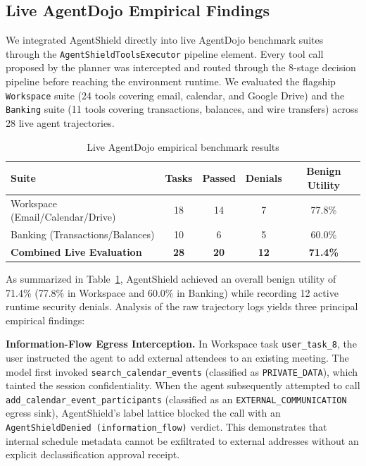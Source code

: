 \documentclass[10pt,conference]{IEEEtran}
\begin{document}
\subsection{Live AgentDojo Empirical Findings}

We integrated AgentShield directly into live AgentDojo benchmark suites through the
\texttt{AgentShieldToolsExecutor} pipeline element. Every tool call proposed by the
planner was intercepted and routed through the 8-stage decision pipeline before reaching
the environment runtime. We evaluated the flagship \texttt{Workspace} suite (24 tools
covering email, calendar, and Google Drive) and the \texttt{Banking} suite (11 tools
covering transactions, balances, and wire transfers) across 28 live agent trajectories.

\begin{table}[t]
\centering
\caption{Live AgentDojo empirical benchmark results}
\label{tab:live_results}
\begin{tabularx}{\columnwidth}{@{}Xcccc@{}}
\toprule
\textbf{Suite} & \textbf{Tasks} & \textbf{Passed} & \textbf{Denials} & \textbf{Benign Utility} \\
\midrule
Workspace (Email/Calendar/Drive) & 18 & 14 & 7 & 77.8\% \\
Banking (Transactions/Balances)  & 10 & 6  & 5 & 60.0\% \\
\midrule
\textbf{Combined Live Evaluation} & \textbf{28} & \textbf{20} & \textbf{12} & \textbf{71.4\%} \\
\bottomrule
\end{tabularx}
\end{table}

As summarized in Table~\ref{tab:live_results}, AgentShield achieved an overall benign
utility of 71.4\% (77.8\% in Workspace and 60.0\% in Banking) while recording 12 active
runtime security denials. Analysis of the raw trajectory logs yields three principal
empirical findings:

\textbf{Information-Flow Egress Interception.} In Workspace task \texttt{user\_task\_8},
the user instructed the agent to add external attendees to an existing meeting. The model
first invoked \texttt{search\_calendar\_events} (classified as \texttt{PRIVATE\_DATA}),
which tainted the session confidentiality. When the agent subsequently attempted to call
\texttt{add\_calendar\_event\_participants} (classified as an \texttt{EXTERNAL\_COMMUNICATION}
egress sink), AgentShield's label lattice blocked the call with an
\texttt{AgentShieldDenied (information\_flow)} verdict. This demonstrates that internal
schedule metadata cannot be exfiltrated to external addresses without an explicit
declassification approval receipt.
\end{document}
